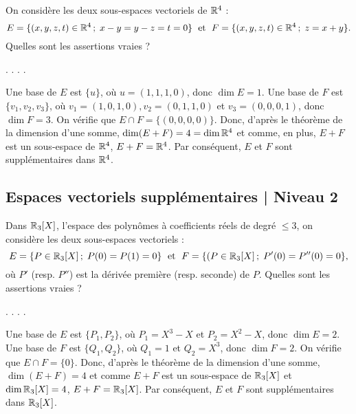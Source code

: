\begin{question}
On considère les deux sous-espaces vectoriels de $\mathbb{R}^4$ :
$$E= \{(x,y,z,t) \in \mathbb{R}^4 \, ; \; x-y=y-z=t=0\}\; \mbox{ et }\; F= \{(x,y,z,t) \in \mathbb{R}^4 \, ; \; z=x+y \}.$$
Quelles sont les assertions vraies ?
\begin{answers}  
.
.
.
.
\end{answers}
\begin{explanations} Une base de $E$ est $\{u\}$, où $u= (1,1,1,0)$, donc $\dim E=1$. Une base de $F$ est $\{v_1,v_2,v_3\}$, où $v_1= (1,0,1,0), v_2= (0,1,1,0)$ et $v_3= (0,0,0,1)$, donc $\dim F=3$. On vérifie que $E\cap F =\{(0,0,0,0)\}$. Donc, d'après le théorème de la dimension d'une somme, $\dim (E+F)=4=\dim \mathbb{R}^4$ et comme, en plus, $E+F$ est un sous-espace de $\mathbb{R}^4$, $E+F=\mathbb{R}^4$. Par conséquent, $E$ et $F$ sont supplémentaires dans $\mathbb{R}^4$.
\end{explanations}
\end{question}

\subsection{Espaces vectoriels supplémentaires | Niveau 2}

\begin{question}
Dans $\mathbb{R}_3[X]$, l'espace des polynômes à coefficients réels  de degré $\le 3$, on considère les deux sous-espaces vectoriels : 
$$E= \{P \in \mathbb{R}_3[X] \, ; \; P(0)=P(1)=0\}\; \mbox{ et }\; F= \{(P\in \mathbb{R}_3[X] \, ; \; P'(0)=P''(0)=0 \},$$
où $P'$ (resp. $P''$) est la dérivée première (resp. seconde) de $P$. Quelles sont les assertions vraies ?
\begin{answers}  
.
.
.
.
\end{answers}
\begin{explanations} Une base de $E$ est $\{P_1,P_2\}$,  où $P_1=X^3-X$ et $P_2=X^2-X$, donc $\dim E=2$. Une base de $F$ est $\{Q_1,Q_2\}$, où $Q_1=1$ et $Q_2=X^3$, donc $\dim F=2$. On vérifie que $E\cap F =\{0\}$. Donc, d'après le théorème de la dimension d'une somme, $\dim (E+F) = 4$ et comme $E+F$ est un sous-espace de $\mathbb{R}_3[X]$ et $\dim \mathbb{R}_3[X]=4$, $E+F= \mathbb{R}_3[X]$. Par conséquent, $E$ et $F$ sont  supplémentaires dans $\mathbb{R}_3[X]$.
\end{explanations}
\end{question}

